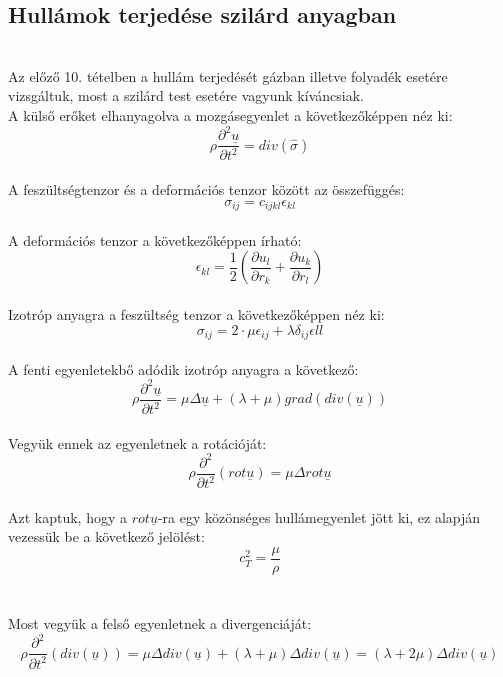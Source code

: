 \documentclass[a4paper]{article}
\begin{document}
\subsection*{Hullámok terjedése szilárd anyagban}
\\
Az előző 10. tételben a hullám terjedését gázban illetve folyadék esetére vizsgáltuk, most a szilárd test esetére vagyunk kíváncsiak.
\\
A külső erőket elhanyagolva a mozgásegyenlet a következőképpen néz ki:
\begin{equation}
\rho \frac{\partial^{2} \underline{u}}{\partial t^{2}}=div(\hat{\sigma})
\end{equation}
\\
A feszültségtenzor és a deformációs tenzor között az összefüggés:
\begin{equation}
\sigma_{ij}=c_{ijkl} \epsilon_{kl}
\end{equation}
\\
A deformációs tenzor a következőképpen írható:
\begin{equation}
\epsilon_{kl}=\frac{1}{2} (\frac{\partial u_l}{\partial r_k}+\frac{\partial u_k}{\partial r_l})
\end{equation}
\\
Izotróp anyagra a feszültség tenzor a következőképpen néz ki:
\begin{equation}
\sigma_{ij}=2 \cdot \mu \epsilon_{ij} + \lambda \delta_{ij} \epsilon{ll}
\end{equation}
\\
A fenti egyenletekbő adódik izotróp anyagra a következő:
\begin{equation}
\rho \frac{\partial^{2} \underline{u}}{\partial t^{2}}= \mu \Delta \underline{u}+ (\lambda + \mu) grad(div(\underline{u}))
\end{equation}
\\
Vegyük ennek az egyenletnek a rotációját:
\begin{equation}
\rho \frac{\partial^{2} }{\partial t^{2}}(rot \underline{u})= \mu \Delta rot\underline{u}
\end{equation}
\\
Azt kaptuk, hogy a $rot \underline{u}$-ra egy közönséges hullámegyenlet jött ki, ez alapján vezessük be a következő jelölést:
\begin{equation}
c_T^{2}=\frac{\mu}{\rho}
\end{equation}
\\
\\
Most vegyük a felső egyenletnek a divergenciáját:
\begin{equation}
\rho \frac{\partial^{2} }{\partial t^{2}}(div (\underline{u}))= \mu \Delta div (\underline{u})+ (\lambda + \mu) \Delta div(\underline{u})=(\lambda +2 \mu) \Delta div(\underline{u})
\end{equation}
\end{document}
